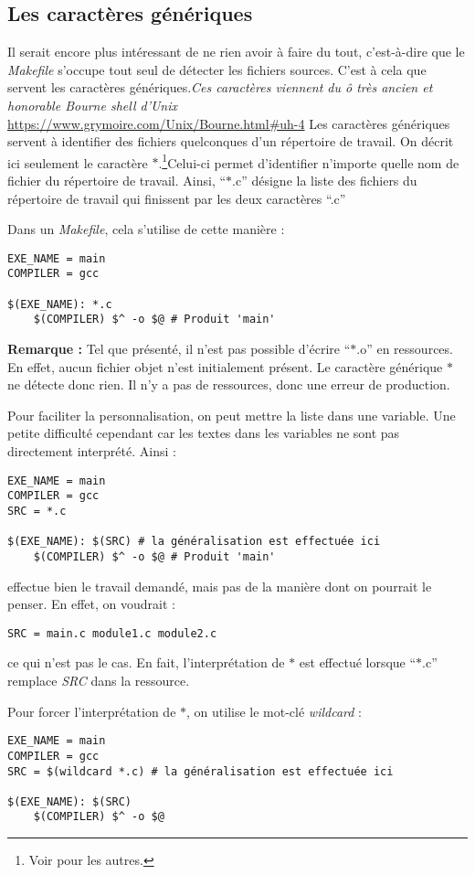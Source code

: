 \documentclass[../../../main.tex]{subfiles}
\begin{document}
\subsection{Les caractères génériques}
Il serait encore plus intéressant de ne rien avoir à faire du tout, c'est-à-dire que le \textit{Makefile} s'occupe tout seul de détecter les fichiers sources. C'est à cela que servent les caractères génériques.\textit{Ces caractères viennent du ô très ancien et honorable Bourne shell d'\textit{Unix}}
 \urldef{\bourneshellurl}\url{https://www.grymoire.com/Unix/Bourne.html#uh-4}
Les caractères génériques servent à identifier des fichiers quelconques d'un répertoire de travail. On décrit ici seulement le caractère $*$.\footnote{Voir \bourneshellurl pour les autres.}Celui-ci permet d'identifier n'importe quelle nom de fichier du répertoire de travail. Ainsi, ``$*$.c'' désigne la liste des fichiers du répertoire de travail qui finissent par les deux caractères ``.c''
 
Dans un \textit{Makefile}, cela s'utilise de cette manière :
\begin{verbatim}
EXE_NAME = main
COMPILER = gcc

$(EXE_NAME): *.c
	$(COMPILER) $^ -o $@ # Produit 'main'
\end{verbatim}
\textbf{Remarque :} Tel que présenté, il n'est pas possible d'écrire ``$*$.o'' en ressources. En effet, aucun fichier objet n'est initialement présent. Le caractère générique $*$ ne détecte donc rien. Il n'y a pas de ressources, donc une erreur de production.
 
Pour faciliter la personnalisation, on peut mettre la liste dans une variable. Une petite difficulté cependant car les textes dans les variables ne sont pas directement interprété. Ainsi :
\begin{verbatim}
EXE_NAME = main
COMPILER = gcc
SRC = *.c

$(EXE_NAME): $(SRC) # la généralisation est effectuée ici
	$(COMPILER) $^ -o $@ # Produit 'main'
\end{verbatim}
effectue bien le travail demandé, mais pas de la manière dont on pourrait le penser. En effet, on voudrait :
\begin{verbatim}
SRC = main.c module1.c module2.c
\end{verbatim}
ce qui n'est pas le cas. En fait, l'interprétation de $*$ est effectué lorsque ``$*$.c'' remplace \textit{SRC} dans la ressource.
 
Pour forcer l'interprétation de $*$, on utilise le mot-clé \textit{wildcard} :
\begin{verbatim}
EXE_NAME = main
COMPILER = gcc
SRC = $(wildcard *.c) # la généralisation est effectuée ici

$(EXE_NAME): $(SRC)
	$(COMPILER) $^ -o $@
\end{verbatim}
\end{document}
